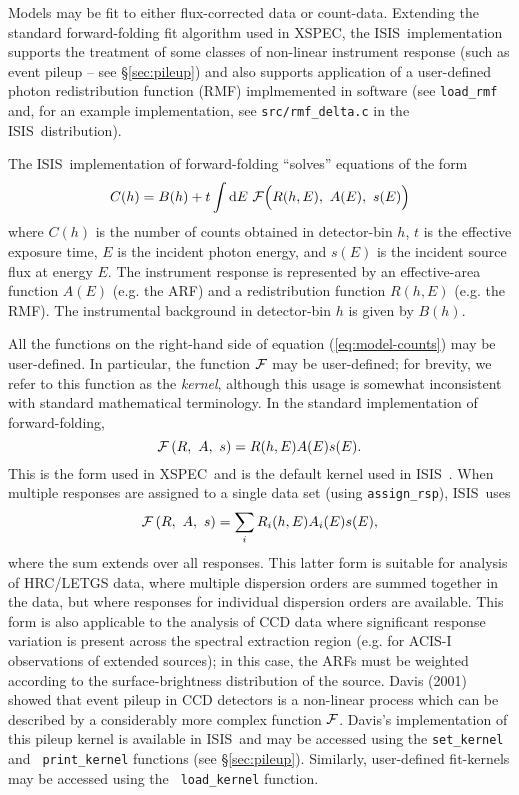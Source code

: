 \documentclass{book}
\newcommand{\D}{{\rm d}}
\newcommand{\isisx}{{\sc ISIS~}}
\newcommand{\xspec}{{\sc XSPEC}}
\begin{document}
{Models may be fit to either flux-corrected data or count-data.
Extending the standard forward-folding fit algorithm used in \xspec,
the \isisx implementation supports the treatment of some classes of
non-linear instrument response (such as event pileup -- see
\S\ref{sec:pileup}) and also supports application of a user-defined
photon redistribution function (RMF) implmemented in software (see
{\tt load\_rmf} and, for an example implementation, see
\verb|src/rmf_delta.c| in the \isisx distribution).

The \isisx implementation of forward-folding ``solves'' equations
of the form
\begin{equation}
    C(h) = B(h) + t \int \D E~{\cal F}\Bigl(R(h,E),\ A(E),\ s(E)\Bigr)
\label{eq:model-counts}
\end{equation}
where $C(h)$ is the number of counts obtained in detector-bin $h$,
$t$ is the effective exposure time, $E$ is the incident photon energy, and
$s(E)$ is the incident source flux at energy $E$.  The instrument response
is represented by an effective-area function $A(E)$ (e.g. the ARF)
and a redistribution function $R(h, E)$ (e.g. the RMF).  The
instrumental background in detector-bin $h$ is given by $B(h)$.

All the functions on the right-hand side of equation
(\ref{eq:model-counts}) may be user-defined.  In particular, the
function ${\cal F}$ may be user-defined; for brevity, we refer to
this function as the {\it kernel}, although this usage is somewhat
inconsistent with standard mathematical terminology. In the
standard implementation of forward-folding,
\begin{equation}
   {\cal F}\left(R,\ A,\ s\right) = R(h,E)A(E)s(E).
\end{equation}
This is the form used in \xspec\  and is the default kernel used in
\isisx.  When multiple responses are assigned to a single data set (using
{\tt assign\_rsp}), \isisx uses
\begin{equation}
   {\cal F}\left(R,\ A,\ s\right) = \sum_i R_i(h,E)A_i(E)s(E),
\end{equation}
where the sum extends over all responses.  This latter form is
suitable for analysis of HRC/LETGS data, where multiple dispersion
orders are summed together in the data, but where responses for
individual dispersion orders are available.  This form is also
applicable to the analysis of CCD data where significant response
variation is present across the spectral extraction region (e.g.
for ACIS-I observations of extended sources); in this case, the
ARFs must be weighted according to the surface-brightness
distribution of the source. Davis (2001) showed that event pileup
in CCD detectors is a non-linear process which can be described by
a considerably more complex function ${\cal F}$. Davis's
implementation of this pileup kernel is available in \isisx and
may be accessed using the {\tt set\_kernel} and {\tt
print\_kernel} functions (see \S\ref{sec:pileup}).  Similarly,
user-defined fit-kernels may be accessed using the {\tt
load\_kernel} function.

}
\end{document}
